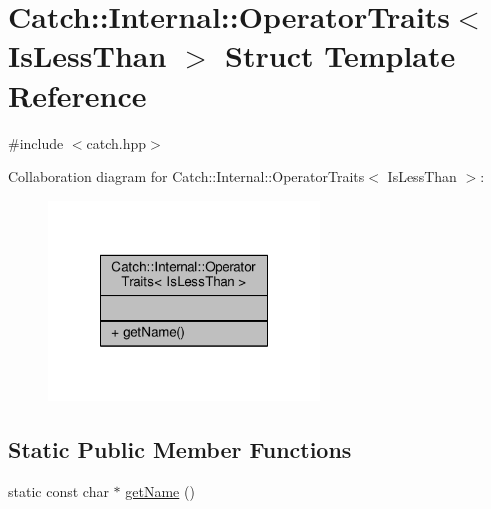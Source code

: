 \hypertarget{struct_catch_1_1_internal_1_1_operator_traits_3_01_is_less_than_01_4}{\section{Catch\-:\-:Internal\-:\-:Operator\-Traits$<$ Is\-Less\-Than $>$ Struct Template Reference}
\label{struct_catch_1_1_internal_1_1_operator_traits_3_01_is_less_than_01_4}
}


{\ttfamily \#include $<$catch.\-hpp$>$}



Collaboration diagram for Catch\-:\-:Internal\-:\-:Operator\-Traits$<$ Is\-Less\-Than $>$\-:
\nopagebreak
\begin{figure}[H]
\begin{center}
\leavevmode
\includegraphics[width=204pt]{struct_catch_1_1_internal_1_1_operator_traits_3_01_is_less_than_01_4__coll__graph}
\end{center}
\end{figure}
\subsection*{Static Public Member Functions}
\begin{DoxyCompactItemize}
\item 
static const char $\ast$ \hyperlink{struct_catch_1_1_internal_1_1_operator_traits_3_01_is_less_than_01_4_aa3b536ddbd2e34b1253931ff00c32712}{get\-Name} ()
\end{DoxyCompactItemize}


